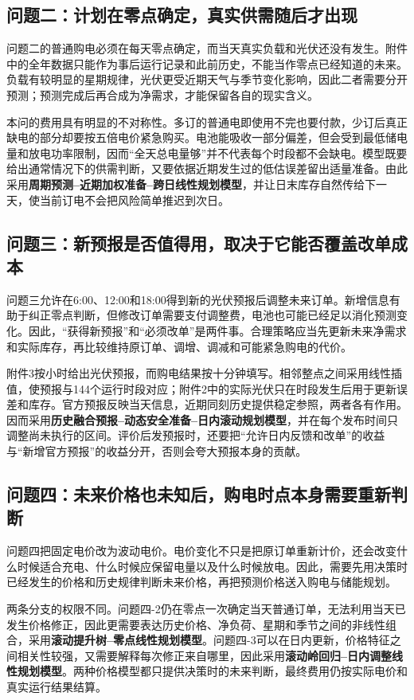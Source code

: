\subsection{问题二：计划在零点确定，真实供需随后才出现}

问题二的普通购电必须在每天零点确定，而当天真实负载和光伏还没有发生。附件中的全年数据只能作为事后运行记录和此前历史，不能当作零点已经知道的未来。负载有较明显的星期规律，光伏更受近期天气与季节变化影响，因此二者需要分开预测；预测完成后再合成为净需求，才能保留各自的现实含义。

本问的费用具有明显的不对称性。多订的普通电即使用不完也要付款，少订后真正缺电的部分却要按五倍电价紧急购买。电池能吸收一部分偏差，但会受到最低储电量和放电功率限制，因而“全天总电量够”并不代表每个时段都不会缺电。模型既要给出通常情况下的供需判断，又要依据近期发生过的低估误差留出适量准备。由此采用\textbf{周期预测--近期加权准备--跨日线性规划模型}，并让日末库存自然传给下一天，使当前订电不会把风险简单推迟到次日。

\subsection{问题三：新预报是否值得用，取决于它能否覆盖改单成本}

问题三允许在6:00、12:00和18:00得到新的光伏预报后调整未来订单。新增信息有助于纠正零点判断，但修改订单需要支付调整费，电池也可能已经足以消化预测变化。因此，“获得新预报”和“必须改单”是两件事。合理策略应当先更新未来净需求和实际库存，再比较维持原订单、调增、调减和可能紧急购电的代价。

附件3按小时给出光伏预报，而购电结果按十分钟填写。相邻整点之间采用线性插值，使预报与144个运行时段对应；附件2中的实际光伏只在时段发生后用于更新误差和库存。官方预报反映当天信息，近期同刻历史提供稳定参照，两者各有作用。因而采用\textbf{历史融合预报--动态安全准备--日内滚动规划模型}，并在每个发布时间只调整尚未执行的区间。评价后发预报时，还要把“允许日内反馈和改单”的收益与“新增官方预报”的收益分开，否则会夸大预报本身的贡献。

\subsection{问题四：未来价格也未知后，购电时点本身需要重新判断}

问题四把固定电价改为波动电价。电价变化不只是把原订单重新计价，还会改变什么时候适合充电、什么时候应保留电量以及什么时候放电。因此，需要先用决策时已经发生的价格和历史规律判断未来价格，再把预测价格送入购电与储能规划。

两条分支的权限不同。问题四-2仍在零点一次确定当天普通订单，无法利用当天已发生价格修正，因此更需要表达历史价格、净负荷、星期和季节之间的非线性组合，采用\textbf{滚动提升树--零点线性规划模型}。问题四-3可以在日内更新，价格特征之间相关性较强，又需要解释每次修正来自哪里，因此采用\textbf{滚动岭回归--日内调整线性规划模型}。两种价格模型都只提供决策时的未来判断，最终费用仍按实际电价和真实运行结果结算。


